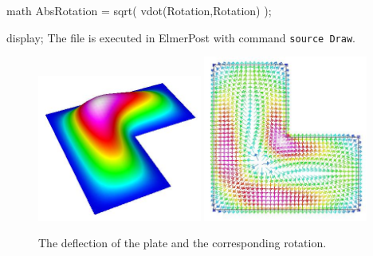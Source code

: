 math AbsRotation = sqrt( vdot(Rotation,Rotation) );

display;
\ttend
The file is executed in ElmerPost with command {\tt source Draw}.
%
\begin{figure}[tbhp]
\begin{center}
\includegraphics[width=0.48\textwidth]{simplePlateDeflection}
\includegraphics[width=0.48\textwidth]{simplePlateRotation}
\end{center}
\caption{The deflection of the plate and the corresponding rotation.}
\label{fig:simplePlateDeflection}
\end{figure}
%

